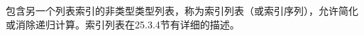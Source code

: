 包含另一个列表索引的非类型类型列表，称为索引列表（或索引序列），允许简化或消除递归计算。索引列表在25.3.4节有详细的描述。










































